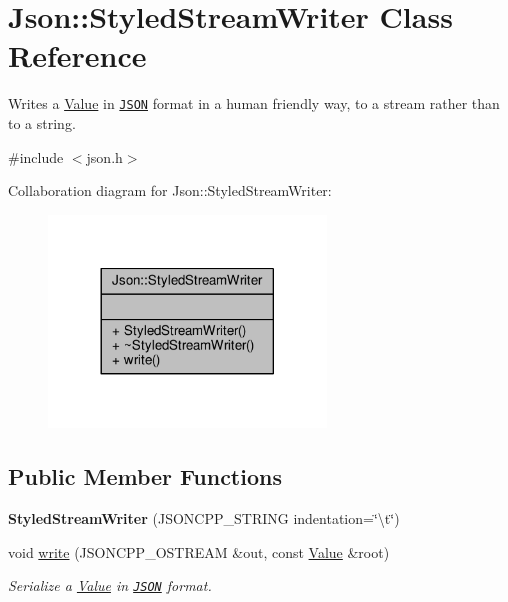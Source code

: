 \hypertarget{classJson_1_1StyledStreamWriter}{}\section{Json\+:\+:Styled\+Stream\+Writer Class Reference}
\label{classJson_1_1StyledStreamWriter}


Writes a \hyperlink{classJson_1_1Value}{Value} in \href{http://www.json.org}{\tt J\+S\+ON} format in a human friendly way, to a stream rather than to a string.  




{\ttfamily \#include $<$json.\+h$>$}



Collaboration diagram for Json\+:\+:Styled\+Stream\+Writer\+:
\nopagebreak
\begin{figure}[H]
\begin{center}
\leavevmode
\includegraphics[width=209pt]{da/d43/classJson_1_1StyledStreamWriter__coll__graph}
\end{center}
\end{figure}
\subsection*{Public Member Functions}
\begin{DoxyCompactItemize}
\item 
{\bfseries Styled\+Stream\+Writer} (J\+S\+O\+N\+C\+P\+P\+\_\+\+S\+T\+R\+I\+NG indentation=\char`\"{}\textbackslash{}t\char`\"{})\hypertarget{classJson_1_1StyledStreamWriter_a71fe3b45a3a5fd6616d807ca99d1a1ef}{}\label{classJson_1_1StyledStreamWriter_a71fe3b45a3a5fd6616d807ca99d1a1ef}

\item 
void \hyperlink{classJson_1_1StyledStreamWriter_a5d89d984fe675641e42c4370cd247774}{write} (J\+S\+O\+N\+C\+P\+P\+\_\+\+O\+S\+T\+R\+E\+AM \&out, const \hyperlink{classJson_1_1Value}{Value} \&root)
\begin{DoxyCompactList}\small\item\em Serialize a \hyperlink{classJson_1_1Value}{Value} in \href{http://www.json.org}{\tt J\+S\+ON} format. \end{DoxyCompactList}\end{DoxyCompactItemize}



